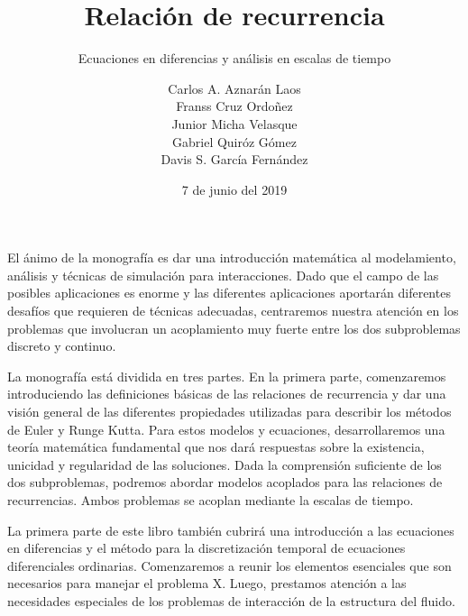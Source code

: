 \documentclass[
	graybox,
	envcountchap,
	sectrefs
]{svmono}
\date{7 de junio del 2019}
\begin{document}
\author{
	Carlos A. Aznarán Laos\\
	Franss Cruz Ordoñez\\
	Junior Micha Velasque\\
	Gabriel Quiróz Gómez\\
	Davis S. García Fernández
}
\title{Relación de recurrencia}
\subtitle{Ecuaciones en diferencias y análisis en escalas de tiempo}
\maketitle

\frontmatter
{}
El ánimo de la monografía es dar una introducción matemática al modelamiento, análisis y técnicas de simulación para interacciones. Dado que el campo de las posibles aplicaciones es enorme y las diferentes aplicaciones aportarán diferentes desafíos que requieren de técnicas adecuadas, centraremos nuestra atención en los problemas que involucran un acoplamiento muy fuerte entre los dos subproblemas discreto y continuo. 

La monografía está dividida en tres partes. En la primera parte, comenzaremos introduciendo las definiciones básicas de las relaciones de recurrencia y dar una visión general de las diferentes propiedades utilizadas para describir los métodos de Euler y Runge Kutta. Para estos modelos y ecuaciones, desarrollaremos una teoría matemática fundamental que nos dará respuestas sobre la existencia, unicidad y regularidad de las soluciones. Dada la comprensión suficiente de los dos subproblemas, podremos abordar modelos acoplados para las relaciones de recurrencias. Ambos problemas se acoplan mediante la escalas de tiempo.

La primera parte de este libro también cubrirá una introducción a las ecuaciones en diferencias y el método para la discretización temporal de ecuaciones diferenciales ordinarias. Comenzaremos a reunir los elementos esenciales que son necesarios para manejar el problema X. Luego, prestamos atención a las necesidades especiales de los problemas de interacción de la estructura del fluido.
\end{document}
